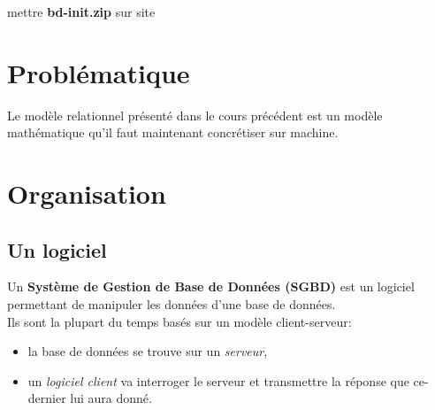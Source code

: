 \documentclass[a4paper,11pt]{article}
\begin{document}
\begin{Form}
\begin{commentprof}
mettre \textbf{bd-init.zip} sur site
\end{commentprof}
\section{Problématique}
Le modèle relationnel présenté dans le cours précédent est un modèle mathématique qu'il faut maintenant concrétiser sur machine.
\begin{center}
\end{center}
\section{Organisation}
\subsection{Un logiciel}
Un \textbf{Système de Gestion de Base de Données (SGBD)} est un logiciel permettant de manipuler les données d'une base de données.\\
Ils sont la plupart du temps basés sur un modèle client-serveur:
\begin{itemize}
\item la base de données se trouve sur un \emph{serveur},
\item un \emph{logiciel client} va interroger le serveur et transmettre la réponse que ce-dernier lui aura donné.
\end{itemize}


\end{Form}
\end{document}

